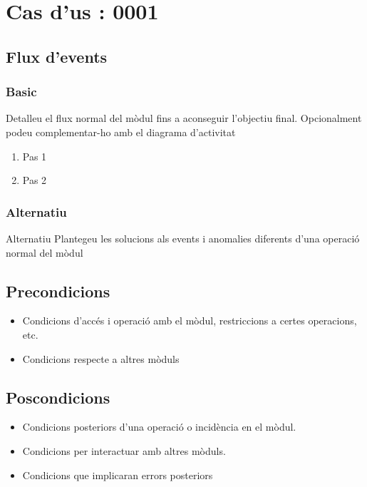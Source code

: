 \section{Cas d’us : 0001}\label{sec:uc0}



\subsection{Flux d’events}

\subsubsection{Basic}
Detalleu el flux normal del mòdul fins a aconseguir l'objectiu final. Opcionalment podeu complementar-ho amb el diagrama d'activitat

\begin{enumerate}
\item Pas 1
\item Pas 2
\end{enumerate}

  \subsubsection{Alternatiu}
Alternatiu
Plantegeu les solucions als events i anomalies diferents d'una operació normal del mòdul
\subsection{Precondicions}
\begin{itemize}
\item Condicions d'accés i operació amb el mòdul, restriccions a certes operacions, etc.
\item Condicions respecte a altres mòduls
\end{itemize}
\subsection{Poscondicions}
\begin{itemize}
\item Condicions posteriors d'una operació o incidència en el mòdul.
\item Condicions per interactuar amb altres mòduls.
\item Condicions que implicaran errors posteriors
\end{itemize}

